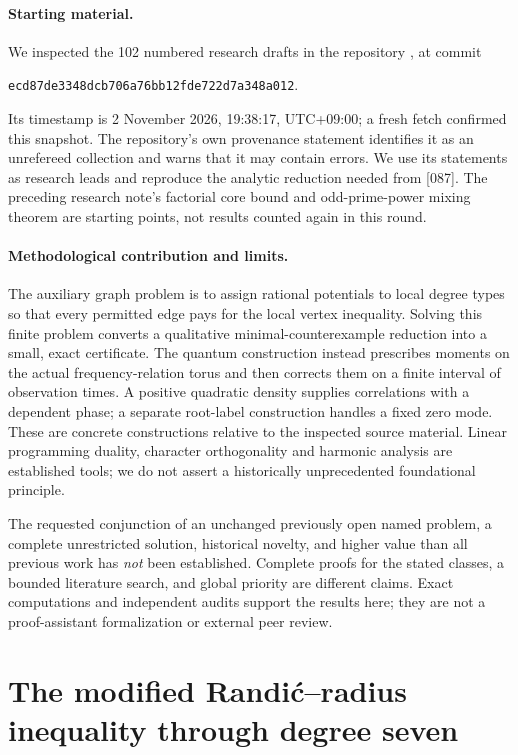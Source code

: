 \documentclass[11pt,a4paper]{article}
\theoremstyle{definition}\newtheorem{definition}[theorem]{Definition}
\theoremstyle{remark}\newtheorem{remark}[theorem]{Remark}
\begin{document}
\paragraph{Starting material.}
We inspected the 102 numbered research drafts in the repository
\cite{Corpus}, at commit
\begin{center}\small\texttt{ecd87de3348dcb706a76bb12fde722d7a348a012}.\end{center}
Its timestamp is 2 November 2026, 19:38:17, UTC+09:00; a fresh fetch
confirmed this snapshot. The repository's own provenance statement
identifies it as an unrefereed collection and warns that it may contain
errors. We use its statements as research leads and reproduce the
analytic reduction needed from [087]. The preceding research note's
factorial core bound and odd-prime-power mixing theorem are starting
points, not results counted again in this round.

\paragraph{Methodological contribution and limits.}
The auxiliary graph problem is to assign rational potentials to local
degree types so that every permitted edge pays for the local vertex
inequality. Solving this finite problem converts a qualitative
minimal-counterexample reduction into a small, exact certificate.
The quantum construction instead prescribes moments on the actual
frequency-relation torus and then corrects them on a finite interval of
observation times. A positive quadratic density supplies correlations
with a dependent phase; a separate root-label construction handles a
fixed zero mode. These are concrete constructions relative to the
inspected source material. Linear programming duality, character
orthogonality and harmonic analysis are established tools; we do not
assert a historically unprecedented foundational principle.

The requested conjunction of an unchanged previously open named problem,
a complete unrestricted solution, historical novelty, and higher value
than all previous work has \emph{not} been established. Complete proofs
for the stated classes, a bounded literature search, and global priority
are different claims. Exact computations and independent audits support
the results here; they are not a proof-assistant formalization or external
peer review.


\section{The modified Randi\'c--radius inequality through degree seven}
\label{sec:g7-main}
\end{document}

